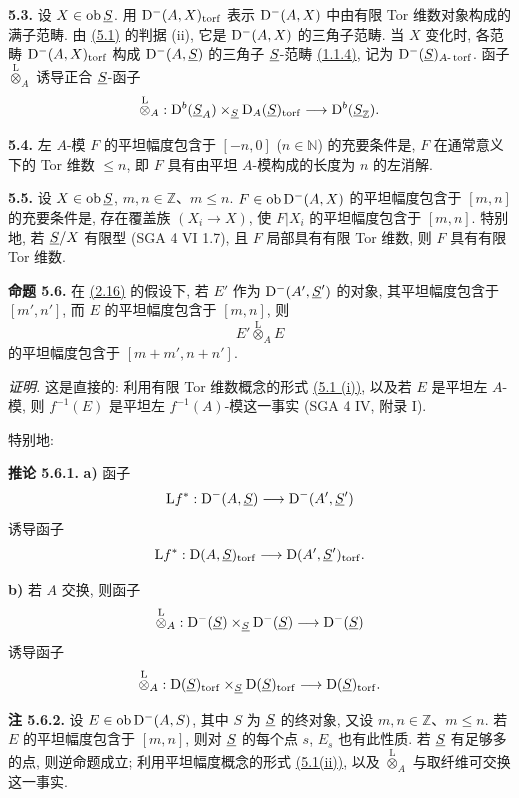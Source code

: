\textbf{5.3.} 设 \(X\in\operatorname{ob}\underline S\). 用 \(\mathrm D^-(A,X)_{\operatorname{torf}}\) 表示 \(\mathrm D^-(A,X)\) 中由有限 Tor 维数对象构成的满子范畴. 由 \hyperlink{sga6.e01.prop.5-1}{(5.1)} 的判据 (ii), 它是 \(\mathrm D^-(A,X)\) 的三角子范畴. 当 \(X\) 变化时, 各范畴 \(\mathrm D^-(A,X)_{\operatorname{torf}}\) 构成 \(\mathrm D^-(A,\underline S)\) 的三角子 \(\underline S\)-范畴 \hyperlink{sga6.e01.para.1-1-4}{(1.1.4)}, 记为 \(\mathrm D^-(\underline S)_{A\text{-}\operatorname{torf}}\). 函子 \(\overset{\mathrm L}{\otimes}_A\) 诱导正合 \(\underline S\)-函子
\[
  \overset{\mathrm L}{\otimes}_A:
  \mathrm D^b(\underline S_A)\times_{\underline S} \mathrm D_A(\underline S)_{\operatorname{torf}}
  \longrightarrow \mathrm D^b(\underline S_{\mathbb Z}).
\]

\textbf{5.4.} 左 \(A\)-模 \(F\) 的平坦幅度包含于 \([-n,0]\) (\(n\in\mathbb N\)) 的充要条件是, \(F\) 在通常意义下的 Tor 维数 \(\leq n\), 即 \(F\) 具有由平坦 \(A\)-模构成的长度为 \(n\) 的左消解.

\textbf{5.5.} 设 \(X\in\operatorname{ob}\underline S\), \(m,n\in\mathbb Z\)、\(m\leq n\). \(F\in\operatorname{ob}\mathrm D^-(A,X)\) 的平坦幅度包含于 \([m,n]\) 的充要条件是, 存在覆盖族 \((X_i\to X)\), 使 \(F|X_i\) 的平坦幅度包含于 \([m,n]\). 特别地, 若 \(\underline S/X\) 有限型 (SGA 4 VI 1.7), 且 \(F\) 局部具有有限 Tor 维数, 则 \(F\) 具有有限 Tor 维数.

\textbf{命题 5.6.} 在 \hyperlink{sga6.e01.cor.2-16}{(2.16)} 的假设下, 若 \(E'\) 作为 \(\mathrm D^-(A',\underline S')\) 的对象, 其平坦幅度包含于 \([m',n']\), 而 \(E\) 的平坦幅度包含于 \([m,n]\), 则
\[
  E'\overset{\mathrm L}{\otimes}_A E
\]
的平坦幅度包含于 \([m+m',n+n']\).

\emph{证明.} 这是直接的: 利用有限 Tor 维数概念的形式 \hyperlink{sga6.e01.prop.5-1}{(5.1 (i))}, 以及若 \(E\) 是平坦左 \(A\)-模, 则 \(f^{-1}(E)\) 是平坦左 \(f^{-1}(A)\)-模这一事实 (SGA 4 IV, 附录 I).

特别地:

\textbf{推论 5.6.1.} \textbf{a)} 函子
\[
  \mathrm L f^*:\mathrm D^-(A,\underline S)\longrightarrow \mathrm D^-(A',\underline S')
\]
诱导函子
\[
  \mathrm L f^*:\mathrm D(A,\underline S)_{\operatorname{torf}}\longrightarrow \mathrm D(A',\underline S')_{\operatorname{torf}}.
\]

\textbf{b)} 若 \(A\) 交换, 则函子
\[
  \overset{\mathrm L}{\otimes}_A:
  \mathrm D^-(\underline S)\times_{\underline S}\mathrm D^-(\underline S)\longrightarrow \mathrm D^-(\underline S)
\]
诱导函子
\[
  \overset{\mathrm L}{\otimes}_A:
  \mathrm D(\underline S)_{\operatorname{torf}}\times_{\underline S}\mathrm D(\underline S)_{\operatorname{torf}}
  \longrightarrow \mathrm D(\underline S)_{\operatorname{torf}}.
\]

\textbf{注 5.6.2.} 设 \(E\in\operatorname{ob}\mathrm D^-(A,S)\), 其中 \(S\) 为 \(\underline S\) 的终对象, 又设 \(m,n\in\mathbb Z\)、\(m\leq n\). 若 \(E\) 的平坦幅度包含于 \([m,n]\), 则对 \(\underline S\) 的每个点 \(s\), \(E_s\) 也有此性质. 若 \(\underline S\) 有足够多的点, 则逆命题成立; 利用平坦幅度概念的形式 \hyperlink{sga6.e01.prop.5-1}{(5.1(ii))}, 以及 \(\overset{\mathrm L}{\otimes}_A\) 与取纤维可交换这一事实.

